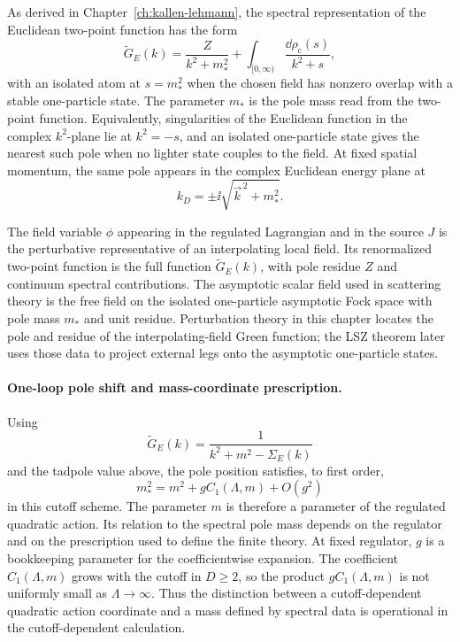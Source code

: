 \begin{definition}
\label{def:pole-mass-interpolating-scalar-field}
As derived in Chapter~\ref{ch:kallen-lehmann}, the spectral representation of
the Euclidean two-point function has the form
\[
  \widetilde G_E(k)
  =
  \frac{Z}{k^2+m_*^2}
  +
  \int_{[0,\infty)}
  \frac{\dd\rho_{\mathrm c}(s)}{k^2+s},
\]
with an isolated atom at \(s=m_*^2\) when the chosen field has nonzero overlap
with a stable one-particle state. The parameter \(m_*\) is the pole mass read
from the two-point function. Equivalently, singularities of the Euclidean
function in the complex \(k^2\)-plane lie at \(k^2=-s\), and an isolated
one-particle state gives the nearest such pole when no lighter state couples to
the field. At fixed spatial momentum, the same pole appears in the complex
Euclidean energy plane at
\[
  k_D=\pm\ii\sqrt{\vec k^{\,2}+m_*^2}.
\]

The field variable \(\phi\) appearing in the regulated Lagrangian and in the
source \(J\) is the perturbative representative of an interpolating local
field.  Its renormalized two-point function is the full function
\(\widetilde G_E(k)\), with pole residue \(Z\) and continuum spectral
contributions.  The asymptotic scalar field used in scattering theory is the
free field on the isolated one-particle asymptotic Fock space with pole mass
\(m_*\) and unit residue.  Perturbation theory in this chapter locates the pole
and residue of the interpolating-field Green function; the LSZ theorem later
uses those data to project external legs onto the asymptotic one-particle
states.
\end{definition}

\paragraph{One-loop pole shift and mass-coordinate prescription.}
\label{par:one-loop-pole-shift-mass-coordinate-prescription}
Using
\[
  \widetilde G_E(k)
  =
  \frac{1}{k^2+m^2-\Sigma_E(k)}
\]
and the tadpole value above, the pole position satisfies, to first order,
\[
  m_*^2=m^2+gC_1(\Lambda,m)+O(g^2)
\]
in this cutoff scheme. The parameter \(m\) is therefore a parameter of the
regulated quadratic action. Its relation to the spectral pole mass depends on
the regulator and on the prescription used to define the finite theory.
At fixed regulator, \(g\) is a bookkeeping parameter for the coefficientwise
expansion. The coefficient \(C_1(\Lambda,m)\) grows with the cutoff in
\(D\ge2\), so the product \(gC_1(\Lambda,m)\) is not uniformly small as
\(\Lambda\to\infty\). Thus the distinction between a cutoff-dependent
quadratic action coordinate and a mass defined by spectral data is
operational in the cutoff-dependent calculation.

